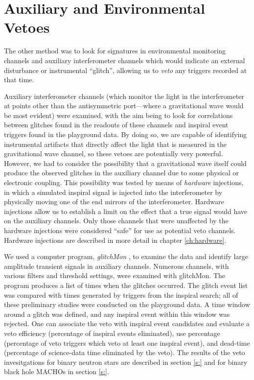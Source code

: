 \section{Auxiliary and Environmental Vetoes}
\label{s:dq}

The other method was to look for signatures in environmental monitoring
channels and auxiliary interferometer channels which would indicate an
external disturbance or instrumental ``glitch'', allowing us to {\it veto} any
triggers recorded at that time.

Auxiliary interferometer channels (which monitor the light in the
interferometer at points other than the antisymmetric port---where a
gravitational wave would be most evident) were examined, with the aim being to
look for correlations between glitches found in the readouts of these channels
and inspiral event triggers found in the playground data.  By doing so, we are
capable of identifying instrumental artifacts that directly affect the light
that is measured in the gravitational wave channel, so these vetoes are
potentially very powerful.  However, we had to consider the possibility that a
gravitational wave itself could produce the observed glitches in the auxiliary
channel due to some physical or electronic coupling.  This possibility was
tested by means of {\em hardware} injections, in which a simulated inspiral
signal is injected into the interferometer by physically moving one of the end
mirrors of the interferometer. Hardware injections allow us to establish a
limit on the effect that a true signal would have on the auxiliary channels.
Only those channels that were unaffected by the hardware injections were
considered ``safe'' for use as potential veto channels. Hardware injections
are described in more detail in chapter \ref{ch:hardware}.

We used a computer program, {\it glitchMon} \cite{glitchMon}, to examine the
data and identify large amplitude transient signals in auxiliary channels.
Numerous channels, with various filters and threshold settings, were examined
with glitchMon. The program produces a list of times when the glitches
occurred. The glitch event list was compared with times generated by triggers
from the inspiral search; all of these preliminary studies were conducted on
the playground data. A time window around a glitch was defined, and any
inspiral event within this window was rejected. One can associate the veto
with inspiral event candidates and evaluate a veto efficiency (percentage of
inspiral events eliminated), use percentage (percentage of veto triggers which
veto at least one inspiral event), and dead-time (percentage of science-data
time eliminated by the veto). The results of the veto invesitgations for
binary neutron stars are described in section \ref{s:} and for binary black
hole MACHOs in section \ref{s:}.

